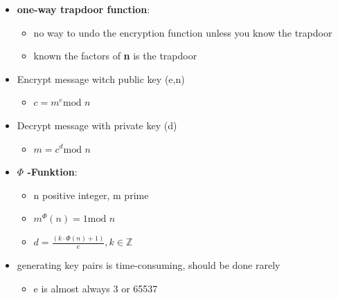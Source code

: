 \documentclass[11pt,twoside,landscape]{article}
\begin{document}
\begin{multicols}{4}
\begin{itemize}
\item \textbf{one-way trapdoor function}:
\begin{itemize}
\item no way to undo the encryption function unless you know the trapdoor
\item known the factors of \textbf{n} is the trapdoor
\end{itemize}

\item Encrypt message witch public key (e,n)
\begin{itemize}
\item \(c=m^e \text{mod } n\)
\end{itemize}
\item Decrypt message with private key (d)
\begin{itemize}
\item \(m = c^d \text{mod }n\)
\end{itemize}

\item \textbf{\(\Phi\) -Funktion}:
\begin{itemize}
\item n positive integer, m prime
\item \(m^{\Phi}(n) = 1 \text{mod } n\)
\item \(d = \frac{(k \cdot \Phi(n) + 1)}{e}, k \in \mathbb{Z}\)
\end{itemize}

\item generating key pairs is time-consuming, should be done rarely
\begin{itemize}
\item e is almost always 3 or 65537
\end{itemize}
\end{itemize}



\end{multicols}
\end{document}
